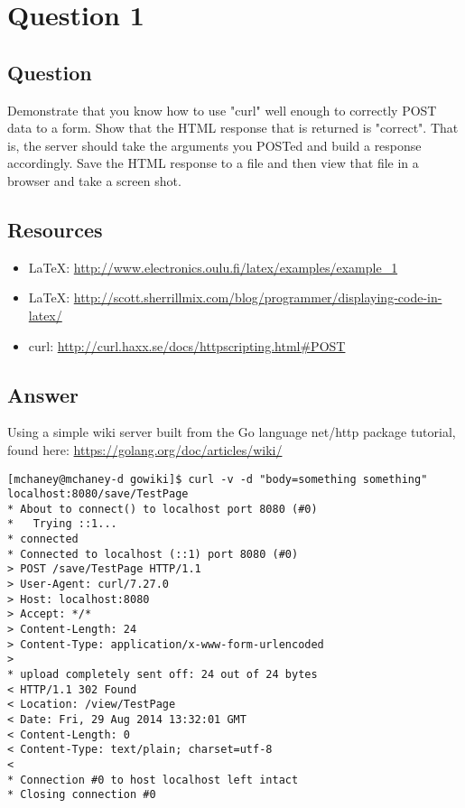 \section{Question 1}

\subsection{Question}
Demonstrate that you know how to use "curl" well enough to 
correctly POST data to a form.  Show that the HTML response that
is returned is "correct".  That is, the server should take the
arguments you POSTed and build a response accordingly.  Save the
HTML response to a file and then view that file in a browser and
take a screen shot.

\subsection{Resources}
\begin{itemize}
\item \LaTeX: \url{http://www.electronics.oulu.fi/latex/examples/example_1}
\item \LaTeX: \url{http://scott.sherrillmix.com/blog/programmer/displaying-code-in-latex/}
\item curl: \url{http://curl.haxx.se/docs/httpscripting.html#POST}
\end{itemize}

\subsection{Answer}
Using a simple wiki server built from the Go language net/http package tutorial, found here: \url{https://golang.org/doc/articles/wiki/}
\begin{lstlisting}
[mchaney@mchaney-d gowiki]$ curl -v -d "body=something something" localhost:8080/save/TestPage
* About to connect() to localhost port 8080 (#0)
*   Trying ::1...
* connected
* Connected to localhost (::1) port 8080 (#0)
> POST /save/TestPage HTTP/1.1
> User-Agent: curl/7.27.0
> Host: localhost:8080
> Accept: */*
> Content-Length: 24
> Content-Type: application/x-www-form-urlencoded
> 
* upload completely sent off: 24 out of 24 bytes
< HTTP/1.1 302 Found
< Location: /view/TestPage
< Date: Fri, 29 Aug 2014 13:32:01 GMT
< Content-Length: 0
< Content-Type: text/plain; charset=utf-8
< 
* Connection #0 to host localhost left intact
* Closing connection #0
\end{lstlisting}